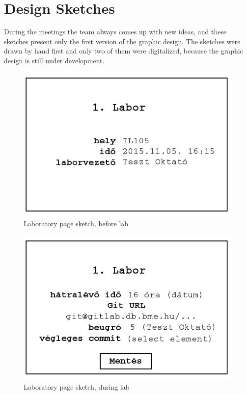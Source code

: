 \chapter{Design Sketches}
\label{appendix-design-sketches}

During the meetings the team always comes up with new ideas, and these sketches present only the first version of the graphic design. The sketches were drawn by hand first and only two of them were digitalized, because the graphic design is still under development. 

%
\begin{figure}[!ht]
	\includegraphics[width=\textwidth]{figures/sketch6.png}
	\caption{Laboratory page sketch, before lab}
	\label{fig:sketch5}
\end{figure}


\begin{figure}[!ht]
	\includegraphics[width=\textwidth]{figures/sketch7.png}
	\caption{Laboratory page sketch, during lab}
	\label{fig:sketch4}
\end{figure}

%
